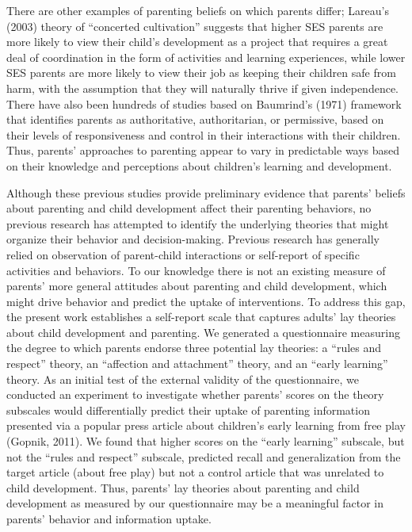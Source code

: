 \documentclass[10pt, letterpaper]{article}
\begin{document}
There are other examples of parenting beliefs on which parents differ;
Lareau's (2003) theory of ``concerted cultivation'' suggests that higher
SES parents are more likely to view their child's development as a
project that requires a great deal of coordination in the form of
activities and learning experiences, while lower SES parents are more
likely to view their job as keeping their children safe from harm, with
the assumption that they will naturally thrive if given independence.
There have also been hundreds of studies based on Baumrind's (1971)
framework that identifies parents as authoritative, authoritarian, or
permissive, based on their levels of responsiveness and control in their
interactions with their children. Thus, parents' approaches to parenting
appear to vary in predictable ways based on their knowledge and
perceptions about children's learning and development.

Although these previous studies provide preliminary evidence that
parents' beliefs about parenting and child development affect their
parenting behaviors, no previous research has attempted to identify the
underlying theories that might organize their behavior and
decision-making. Previous research has generally relied on observation
of parent-child interactions or self-report of specific activities and
behaviors. To our knowledge there is not an existing measure of parents'
more general attitudes about parenting and child development, which
might drive behavior and predict the uptake of interventions. To address
this gap, the present work establishes a self-report scale that captures
adults' lay theories about child development and parenting. We generated
a questionnaire measuring the degree to which parents endorse three
potential lay theories: a ``rules and respect'' theory, an ``affection
and attachment'' theory, and an ``early learning'' theory. As an initial
test of the external validity of the questionnaire, we conducted an
experiment to investigate whether parents' scores on the theory
subscales would differentially predict their uptake of parenting
information presented via a popular press article about children's early
learning from free play (Gopnik, 2011). We found that higher scores on
the ``early learning'' subscale, but not the ``rules and respect''
subscale, predicted recall and generalization from the target article
(about free play) but not a control article that was unrelated to child
development. Thus, parents' lay theories about parenting and child
development as measured by our questionnaire may be a meaningful factor
in parents' behavior and information uptake.
\end{document}
